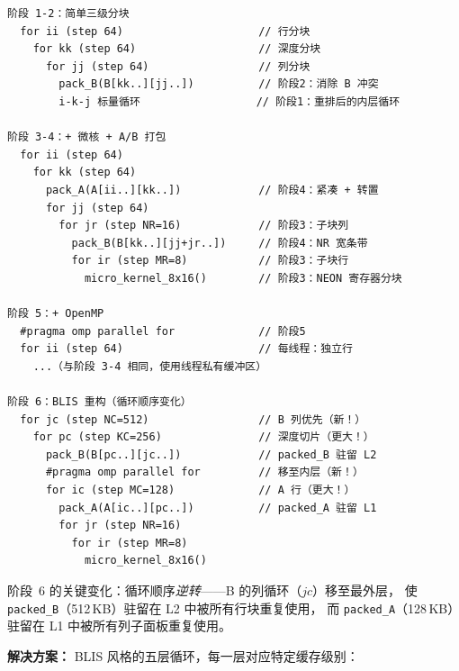 \documentclass[11pt,a4paper]{article}
\begin{document}
\begin{lstlisting}[language={},basicstyle=\ttfamily\scriptsize,
  frame=single,xleftmargin=0.5em,numbers=none,
  moredelim={**[is][\color{red}\bfseries]{@@}{@@}},
  moredelim={**[is][\color{blue}\bfseries]{!!}{!!}}]
阶段 1-2：简单三级分块
  for ii (step 64)                     // 行分块
    for kk (step 64)                   // 深度分块
      for jj (step 64)                 // 列分块
        pack_B(B[kk..][jj..])          // 阶段2：消除 B 冲突
        i-k-j 标量循环                  // 阶段1：重排后的内层循环

阶段 3-4：+ 微核 + A/B 打包
  for ii (step 64)
    for kk (step 64)
      pack_A(A[ii..][kk..])            // 阶段4：紧凑 + 转置
      for jj (step 64)
        for jr (step NR=16)            // 阶段3：子块列
          pack_B(B[kk..][jj+jr..])     // 阶段4：NR 宽条带
          for ir (step MR=8)           // 阶段3：子块行
            micro_kernel_8x16()        // 阶段3：NEON 寄存器分块

阶段 5：+ OpenMP
  #pragma omp parallel for             // 阶段5
  for ii (step 64)                     // 每线程：独立行
    ...（与阶段 3-4 相同，使用线程私有缓冲区）

阶段 6：BLIS 重构（循环顺序变化）
  for jc (step NC=512)                 // B 列优先（新！）
    for pc (step KC=256)               // 深度切片（更大！）
      pack_B(B[pc..][jc..])            // packed_B 驻留 L2
      #pragma omp parallel for         // 移至内层（新！）
      for ic (step MC=128)             // A 行（更大！）
        pack_A(A[ic..][pc..])          // packed_A 驻留 L1
        for jr (step NR=16)
          for ir (step MR=8)
            micro_kernel_8x16()
\end{lstlisting}

阶段~6 的关键变化：循环顺序\emph{逆转}——B 的列循环（$jc$）移至最外层，
使 \texttt{packed\_B}（512\,KB）驻留在 L2 中被所有行块重复使用，
而 \texttt{packed\_A}（128\,KB）驻留在 L1 中被所有列子面板重复使用。

\textbf{解决方案：} BLIS 风格的五层循环，每一层对应特定缓存级别：
\end{document}
